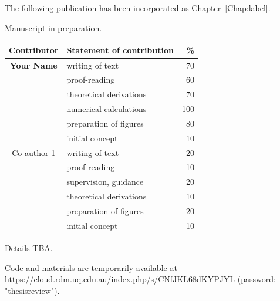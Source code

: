 \cleartoevenpage
\pagestyle{empty}	

\noindent
The following publication has been incorporated as Chapter~\ref{Chap:label}.

\noindent
Manuscript in preparation.

\begin{table}[h]
	\centering
	\begin{tabular}{clr}
		\toprule
		Contributor & Statement of contribution & \% \\
		\midrule
		\textbf{Your Name}				& writing of text 					& 70\\
															& proof-reading							& 60 \\
															& theoretical derivations 	& 70\\
															& numerical calculations 		& 100\\
															& preparation of figures 		& 80 \\
															& initial concept						& 10 \\
		\midrule
		Co-author 1								& writing of text 					& 20\\
															& proof-reading							& 10 \\
															& supervision, guidance 		& 20\\
															& theoretical derivations 	& 10\\
															& preparation of figures 		& 20 \\
															& initial concept						& 10 \\
		\bottomrule
	\end{tabular}
\end{table}

Details TBA.

Code and materials are temporarily available at \href{https://cloud.rdm.uq.edu.au/index.php/s/CNfJKL68dKYPJYL}{https://cloud.rdm.uq.edu.au/index.php/s/CNfJKL68dKYPJYL} (password: "thesisreview").


